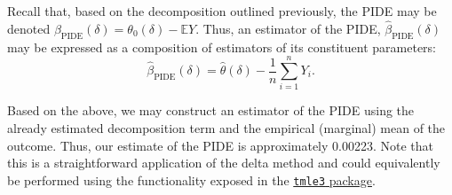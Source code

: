 \documentclass[12pt, krantz2,]{krantz}
\newenvironment{Shaded}{\begin{snugshade}}{\end{snugshade}}
\newcommand{\CommentTok}[1]{\textcolor[rgb]{0.37,0.37,0.37}{\textit{#1}}}
\newcommand{\DataTypeTok}[1]{\textcolor[rgb]{0.27,0.27,0.27}{#1}}
\newcommand{\DecValTok}[1]{\textcolor[rgb]{0.06,0.06,0.06}{#1}}
\newcommand{\FloatTok}[1]{\textcolor[rgb]{0.06,0.06,0.06}{#1}}
\newcommand{\KeywordTok}[1]{\textcolor[rgb]{0.27,0.27,0.27}{\textbf{#1}}}
\newcommand{\NormalTok}[1]{#1}
\newcommand{\OperatorTok}[1]{\textcolor[rgb]{0.43,0.43,0.43}{\textbf{#1}}}
\newcommand{\OtherTok}[1]{\textcolor[rgb]{0.37,0.37,0.37}{#1}}
\newcommand{\StringTok}[1]{\textcolor[rgb]{0.5,0.5,0.5}{#1}}
\theoremstyle{definition}
\theoremstyle{definition}
\theoremstyle{definition}
\newcommand{\1}{\mathbbm{1}}
\begin{document}
\begin{Shaded}
\end{Shaded}

Recall that, based on the decomposition outlined previously, the PIDE may be
denoted \(\beta_{\text{PIDE}}(\delta) = \theta_0(\delta) - \mathbb{E}Y\). Thus, an
estimator of the PIDE, \(\hat{\beta}_{\text{PIDE}}(\delta)\) may be expressed as a
composition of estimators of its constituent parameters:
\begin{equation*}
  \hat{\beta}_{\text{PIDE}}({\delta}) = \hat{\theta}(\delta) -
  \frac{1}{n} \sum_{i = 1}^n Y_i.
\end{equation*}

Based on the above, we may construct an estimator of the PIDE using the already
estimated decomposition term and the empirical (marginal) mean of the outcome.
Thus, our estimate of the PIDE is approximately
0.00223.
Note that this is a straightforward application of the delta method and could
equivalently be performed using the functionality exposed in the \href{https://github.com/tlverse/tmle3}{\texttt{tmle3}
package}.
\end{document}
